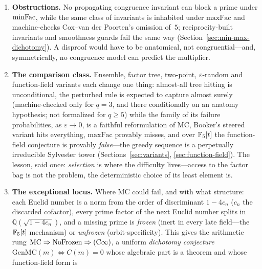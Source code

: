 \begin{enumerate}[nosep,leftmargin=*]
  sometimes small relative to size'', below that $(\mathrm{C}\infty)$; all
  the implications are proved.  The ladder bottoms out at Sylvester-tower
  primality, a statement of the shape of the Fermat question, and the
  arboreal input a Chebotarev argument would supply is free---the residual
  gap is a size condition on one integer's factorization
  (Section~\ref{sec:cinfty}).  \textbf{MC implies this open,
  Fermat-shaped statement.}
\item \textbf{Obstructions.}  No propagating congruence invariant can
  block a prime under $\mathrm{minFac}$, while the same class of invariants is
  inhabited under $\mathrm{maxFac}$ and machine-checks Cox--van der
  Poorten's omission of~$5$; reciprocity-built invariants and smoothness
  guards fail the same way (Section~\ref{sec:min-max-dichotomy}).  A
  disproof would have to be anatomical, not congruential---and,
  symmetrically, no congruence model can predict the multiplier.
\item \textbf{The comparison class.}  Ensemble, factor tree, two-point,
  $\varepsilon$-random and function-field variants each change one
  thing: almost-all tree hitting is unconditional, the perturbed rule
  is expected to capture almost surely (machine-checked only for
  $q = 3$, and there conditionally on an anatomy hypothesis; not
  formalized for $q \ge 5$) while the family of its failure
  probabilities, as $\varepsilon \to 0$, is a faithful
  reformulation of MC, Booker's steered variant hits everything,
  $\mathrm{maxFac}$ provably misses, and over $\mathbb{F}_5[t]$ the
  function-field conjecture is provably \emph{false}---the greedy sequence
  is a perpetually irreducible Sylvester tower
  (Sections~\ref{sec:variants}, \ref{sec:function-field}).  The lesson,
  said once: \emph{selection} is
  where the difficulty lives---access to the factor bag is not the
  problem, the deterministic choice of its least element is.
\item \textbf{The exceptional locus.}  Where MC could fail, and with what
  structure: each Euclid number is a norm from the order of discriminant
  $1-4c_n$ ($c_n$ the discarded cofactor), every prime factor of the next
  Euclid number splits in $\mathbb{Q}(\sqrt{1-4c_n})$, and a missing prime
  is \emph{frozen} (inert in every late field---the $\mathbb{F}_5[t]$ mechanism)
  or \emph{unfrozen} (orbit-specificity).  This gives the arithmetic rung
  $\mathrm{MC} \Rightarrow \mathrm{NoFrozen} \Rightarrow (\mathrm{C}\infty)$, a
  uniform \emph{dichotomy conjecture} $\mathrm{GenMC}(m) \iff C(m)=0$ whose
  algebraic part is a theorem and whose function-field form is

\end{enumerate}
